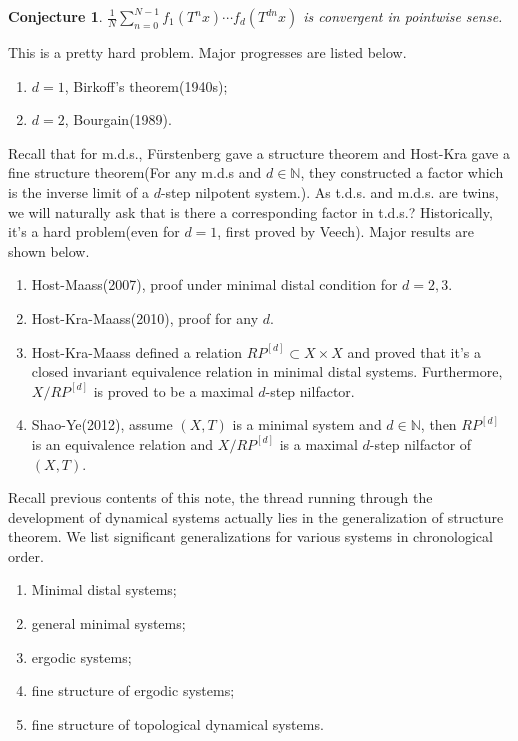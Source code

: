 \documentclass[12pt]{article}
\newtheorem{conjecture}{Conjecture}
\begin{document}
\begin{conjecture}
$\frac{1}{N}\sum_{n=0}^{N-1}f_1(T^nx)\cdots f_d(T^{dn}x) $ is convergent in pointwise sense.
\end{conjecture}
This is a pretty hard problem. Major progresses are listed below.
\begin{enumerate}
	\item $d=1$, Birkoff's theorem(1940s);
	\item $d=2$, Bourgain(1989).
\end{enumerate}
Recall that for m.d.s., F\"urstenberg gave a structure theorem and Host-Kra gave a fine structure theorem(For any m.d.s and $d\in \mathbb N $, they constructed a factor which is the inverse limit of a $d$-step nilpotent system.). As t.d.s. and m.d.s. are twins, we will naturally ask that is there a corresponding factor in t.d.s.? Historically, it's a hard problem(even for $d=1$, first proved by Veech). Major results are shown below.
\begin{enumerate}
	\item Host-Maass(2007), proof under minimal distal condition for $d=2,3$.
	\item Host-Kra-Maass(2010), proof for any $d$.
	\item Host-Kra-Maass defined a relation $RP^{[d]}\subset X\times X $ and proved that it's a closed invariant equivalence relation in minimal distal systems. Furthermore, $X/RP^{[d]} $ is proved to be a maximal $d$-step nilfactor.
	\item Shao-Ye(2012), assume $(X,T) $ is a minimal system and $d\in \mathbb N$, then $RP^{[d]}$ is an equivalence relation and $X/RP^{[d]} $ is a maximal $d$-step nilfactor of $(X,T)$.
\end{enumerate}
Recall previous contents of this note, the thread running through the development of dynamical systems actually lies in the generalization of structure theorem. We list significant generalizations for various systems in chronological order.
\begin{enumerate}
	\item Minimal distal systems;
	\item general minimal systems;
	\item ergodic systems;
	\item fine structure of ergodic systems;
	\item fine structure of topological dynamical systems.
\end{enumerate}
\end{document}
